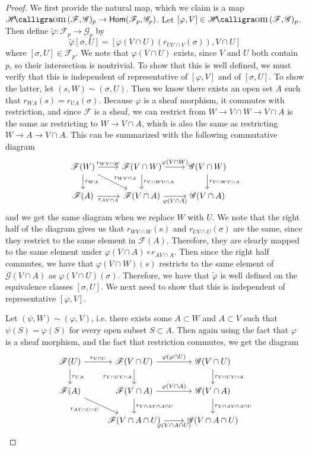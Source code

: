 \documentclass[psamsfonts]{amsart}
\theoremstyle{definition}
\theoremstyle{remark}
\renewcommand{\hom}{\mathsf{Hom}}
\DeclareMathOperator{\sheafhom}{\mathscr{H}\text{\kern -3pt {\calligra\large om}}\,}
\begin{document}
\begin{proof}
We first provide the natural map, which we claim is a map $\sheafhom(\mathscr{F},\mathscr{G})_p \to \hom(\mathscr{F}_p , \mathscr{G}_p)$. Let $[\varphi, V] \in \sheafhom(\mathscr{F},\mathscr{G})_p$. Then define $\tilde{\varphi} : \mathscr{F}_p \to \mathscr{G}_p$ by
$$\tilde{\varphi}[\sigma, U] = [\varphi(V \cap U)(r_{UU\cap V}(\sigma)), V \cap U]$$
where $[\sigma, U] \in \mathscr{F}_p$. We note that $\varphi(V \cap U)$ exists, since $V$ and $U$ both contain $p$, so their intersection is nontrivial. To show that this is well defined, we must verify that this is independent of representative of $[\varphi , V]$ and of $[\sigma , U]$. To show the latter, let $(s,W) \sim (\sigma, U)$. Then we know there exists an open set $A$ such that $r_{WA}(s) = r_{UA}(\sigma)$. Because $\varphi$ is a sheaf morphism, it commutes with restriction, and since $\mathscr{F}$ is a sheaf, we can restrict from $W \to V \cap W \to V \cap A$ is the same as restricting to $W \to V \cap A$, which is also the same as restricting $W \to A \to V \cap A$. This can be summarized with the following commutative diagram
$$\begin{tikzcd}
\mathscr{F}(W) \ar[d, "r_{WA}"] \ar[dr, "r_{WV\cap A}"]\ar[r, "r_{WV \cap W}"] & \mathscr{F}(V \cap W) \ar[d, "r_{V \cap W V \cap A}"]\ar[r, "\varphi(V \cap W)"] & \mathscr{G}(V \cap W) \ar[d, "r_{V \cap W V \cap A}"] \\
\mathscr{F}(A) \ar[r, "r_{AV\cap A}"'] & \mathscr{F}(V \cap A) \ar[r, "\varphi(V\cap A)"'] & \mathscr{G}(V \cap A)
\end{tikzcd}$$
and we get the same diagram when we replace $W$ with $U$. We note that the right half of the diagram gives us that $r_{WV \cap W}(s)$ and $r_{U V \cap U}(\sigma)$ are the same, since they restrict to the same element in $\mathscr{F}(A)$. Therefore, they are clearly mapped to the same element under $\varphi(V \cap A) \circ r_{A V \cap A}$. Then since the right half commutes, we have that $\varphi(V \cap W)(s)$ restricts to the same element of $\mathscr{G}(V \cap A)$ as $\varphi(V \cap U)(\sigma)$. Therefore, we have that $\tilde{\varphi}$ is well defined on the equivalence classes $[\sigma, U]$. We next need to show that this is independent of representative $[\varphi , V]$.

Let $(\psi, W) \sim (\varphi, V)$, i.e. there exists some $A \subset W$ and $A \subset V$ such that $\psi(S) = \varphi(S)$ for every open subset $S \subset A$. Then again using the fact that $\varphi$ is a sheaf morphism, and the fact that restriction commutes, we get the diagram
$$\begin{tikzcd}
\mathscr{F}(U) \ar[d, "r_{UA}"] \ar[r, "r_{V \cap U}"] & \mathscr{F}(V \cap U) \ar[d, "r_{V\cap U V \cap A}"'] \ar[r, "\varphi(\varphi \cap U)"] &  \mathscr{G}(V \cap U) \ar[d, "r_{V\cap U V \cap A}"]\\
\mathscr{F}(A) \ar[dr, "r_{AV\cap U \cap U}"']& \mathscr{F}(V \cap A) \ar[d, "r_{V \cap A V\cap A \cap U}"]\ar[r, "\varphi(V\cap A)"] & \mathscr{G}(V  \cap A) \ar[d, "r_{V \cap A V \cap A \cap U}"]\\
& \mathscr{F}(V \cap A \cap U) \ar[r, "\varphi(V \cap A \cap U)"']& \mathscr{G}(V \cap A \cap U)
\end{tikzcd}$$
\end{proof}
\end{document}
